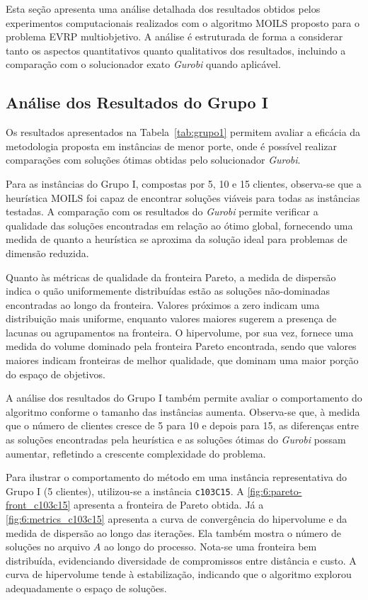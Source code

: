 Esta seção apresenta uma análise detalhada dos resultados obtidos pelos experimentos computacionais realizados com o algoritmo MOILS proposto para o problema EVRP multiobjetivo. A análise é estruturada de forma a considerar tanto os aspectos quantitativos quanto qualitativos dos resultados, incluindo a comparação com o solucionador exato \textit{Gurobi} quando aplicável.

\subsection{Análise dos Resultados do Grupo I}

Os resultados apresentados na Tabela~\ref{tab:grupo1} permitem avaliar a eficácia da metodologia proposta em instâncias de menor porte, onde é possível realizar comparações com soluções ótimas obtidas pelo solucionador \textit{Gurobi}. 

Para as instâncias do Grupo I, compostas por 5, 10 e 15 clientes, observa-se que a heurística MOILS foi capaz de encontrar soluções viáveis para todas as instâncias testadas. A comparação com os resultados do \textit{Gurobi} permite verificar a qualidade das soluções encontradas em relação ao ótimo global, fornecendo uma medida de quanto a heurística se aproxima da solução ideal para problemas de dimensão reduzida.

Quanto às métricas de qualidade da fronteira Pareto, a medida de dispersão indica o quão uniformemente distribuídas estão as soluções não-dominadas encontradas ao longo da fronteira. Valores próximos a zero indicam uma distribuição mais uniforme, enquanto valores maiores sugerem a presença de lacunas ou agrupamentos na fronteira. O hipervolume, por sua vez, fornece uma medida do volume dominado pela fronteira Pareto encontrada, sendo que valores maiores indicam fronteiras de melhor qualidade, que dominam uma maior porção do espaço de objetivos.

A análise dos resultados do Grupo I também permite avaliar o comportamento do algoritmo conforme o tamanho das instâncias aumenta. Observa-se que, à medida que o número de clientes cresce de 5 para 10 e depois para 15, as diferenças entre as soluções encontradas pela heurística e as soluções ótimas do \textit{Gurobi} possam aumentar, refletindo a crescente complexidade do problema.

Para ilustrar o comportamento do método em uma instância representativa do Grupo I (5 clientes), utilizou-se a instância \texttt{c103C15}. A \autoref{fig:6:pareto-front_c103c15} apresenta a fronteira de Pareto obtida. Já a \autoref{fig:6:metrics_c103c15} apresenta a curva de convergência do hipervolume e da medida de dispersão ao longo das iterações. Ela também mostra o número de soluções no arquivo $A$ ao longo do processo. Nota-se uma fronteira bem distribuída, evidenciando diversidade de compromissos entre distância e custo. A curva de hipervolume tende à estabilização, indicando que o algoritmo explorou adequadamente o espaço de soluções.

